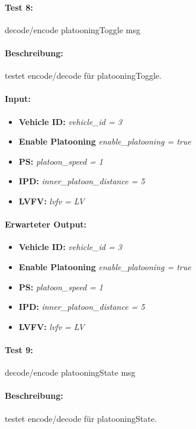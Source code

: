 \documentclass[a4paper, 12pt, titlepage]{scrartcl}
\begin{document}
{			\paragraph{Test 8:}{decode/encode platooningToggle msg}
			\paragraph{Beschreibung:} testet encode/decode für platooningToggle.
			\paragraph{Input:}
			\begin{itemize} \itemsep-0.5em
				\item \textbf{Vehicle ID:} \emph{vehicle\_id = 3}
				\item \textbf{Enable Platooning} \emph{enable\_platooning = true}
				\item \textbf{PS:} \emph{platoon\_speed = 1}
				\item \textbf{IPD:} \emph{inner\_platoon\_distance = 5}
				\item \textbf{LVFV:} \emph{lvfv = LV}
			\end{itemize}
			\paragraph{Erwarteter Output:}
			\begin{itemize} \itemsep-0.5em
				\item \textbf{Vehicle ID:} \emph{vehicle\_id = 3}
				\item \textbf{Enable Platooning} \emph{enable\_platooning = true}
				\item \textbf{PS:} \emph{platoon\_speed = 1}
				\item \textbf{IPD:} \emph{inner\_platoon\_distance = 5}
				\item \textbf{LVFV:} \emph{lvfv = LV}
			\end{itemize}			
	
			\paragraph{Test 9:}{decode/encode platooningState msg}
			\paragraph{Beschreibung:} testet encode/decode für platooningState.
}
\end{document}
